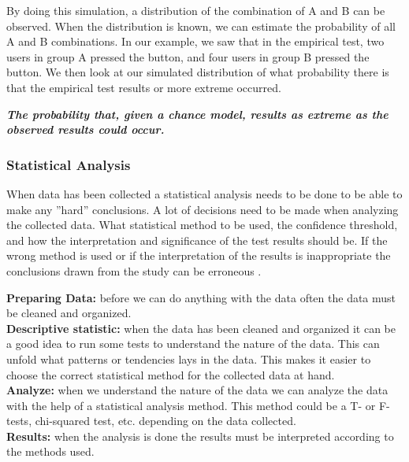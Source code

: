 By doing this simulation, a distribution of the combination of A and B can be observed. When the distribution is known, we can estimate the probability of all A and B combinations. In our example, we saw that in the empirical test, two users in group A pressed the button, and four users in group B pressed the button.  We then look at our simulated distribution of what probability there is that the empirical test results or more extreme occurred.  

\textit{\textbf{The probability that, given a chance model, results as extreme as the observed results could occur.}}








\subsubsection{Statistical Analysis}%
\label{sub:Statistical analysis}
When data has been collected a statistical analysis needs to be done to be able to make any ''hard'' conclusions. A lot of decisions need to be made when analyzing the collected data. What statistical method to be used, the confidence threshold, and how the interpretation and significance of the test results should be. If the wrong method is used or if the interpretation of the results is inappropriate the conclusions drawn from the study can be erroneous \cite{lazar2017research}. 


\textbf{Preparing Data:} before we can do anything with the data often the data must be cleaned and organized.\\
\textbf{Descriptive statistic:} when the data has been cleaned and organized it can be a good idea to run some tests to understand the nature of the data. This can unfold what patterns or tendencies lays in the data. This makes it easier to choose the correct statistical method for the collected data at hand.\\
\textbf{Analyze:} when we understand the nature of the data we can analyze the data with the help of a statistical analysis method. This method could be a T- or F-tests, chi-squared test, etc. depending on the data collected.\\ 
\textbf{Results:} when the analysis is done the results must be interpreted according to the methods used.\\



